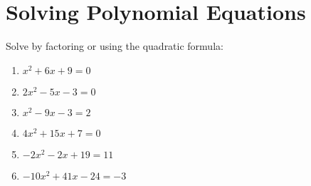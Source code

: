 \documentclass[14pt]{extarticle}
\begin{document}
\section{Solving Polynomial Equations}
{Solve by factoring or using the quadratic formula:}
\begin{enumerate}
    \item {$x^2 + 6x + 9 = 0$ }
    \item {$2x^2 - 5x - 3 = 0$ }
    \item {$x^2 - 9x - 3 = 2$ }
    \item {$4x^2 + 15x + 7 = 0$ }
    \item {$-2x^2 - 2x + 19 = 11$ }
    \item {$-10x^2 + 41x - 24 = -3$ }
\end{enumerate}
\end{document}
